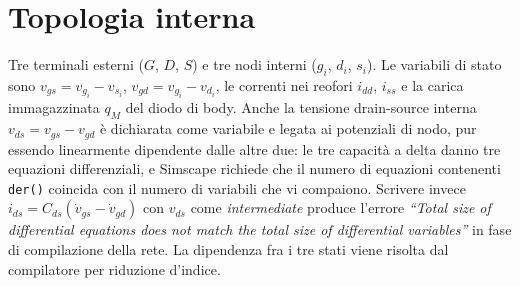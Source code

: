 \documentclass[11pt,a4paper]{article}
\newcommand{\ssc}[1]{\texttt{#1}}
\begin{document}
\section{Topologia interna}

\begin{center}
\end{center}

\noindent Tre terminali esterni ($G$, $D$, $S$) e tre nodi interni
($g_i$, $d_i$, $s_i$). Le variabili di stato sono $v_{gs}=v_{g_i}-v_{s_i}$,
$v_{gd}=v_{g_i}-v_{d_i}$, le correnti nei reofori $i_{dd}$, $i_{ss}$ e la
carica immagazzinata $q_M$ del diodo di body. Anche la tensione
drain-source interna $v_{ds}=v_{gs}-v_{gd}$ è dichiarata come variabile e
legata ai potenziali di nodo, pur essendo linearmente dipendente dalle altre
due: le tre capacità a delta danno tre equazioni differenziali, e Simscape
richiede che il numero di equazioni contenenti \ssc{der()} coincida con il
numero di variabili che vi compaiono. Scrivere invece
$i_{ds}=C_{ds}(\dot v_{gs}-\dot v_{gd})$ con $v_{ds}$ come
\emph{intermediate} produce l'errore \emph{``Total size of differential
equations does not match the total size of differential variables''} in fase
di compilazione della rete. La dipendenza fra i tre stati viene risolta dal
compilatore per riduzione d'indice.
\end{document}
